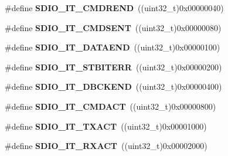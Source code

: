 \begin{DoxyCompactItemize}
\item 
\hypertarget{group___s_d_i_o___interrupt__sources_ga6df3bb694dc00e250cd22e16a03d6910}{\#define {\bfseries S\-D\-I\-O\-\_\-\-I\-T\-\_\-\-C\-M\-D\-R\-E\-N\-D}~((uint32\-\_\-t)0x00000040)}\label{group___s_d_i_o___interrupt__sources_ga6df3bb694dc00e250cd22e16a03d6910}

\item 
\hypertarget{group___s_d_i_o___interrupt__sources_gaf9d8fc4651c4b7555fb9ee4e5af6ca63}{\#define {\bfseries S\-D\-I\-O\-\_\-\-I\-T\-\_\-\-C\-M\-D\-S\-E\-N\-T}~((uint32\-\_\-t)0x00000080)}\label{group___s_d_i_o___interrupt__sources_gaf9d8fc4651c4b7555fb9ee4e5af6ca63}

\item 
\hypertarget{group___s_d_i_o___interrupt__sources_ga6cc1c521b64fc57b844336f7f175dd1e}{\#define {\bfseries S\-D\-I\-O\-\_\-\-I\-T\-\_\-\-D\-A\-T\-A\-E\-N\-D}~((uint32\-\_\-t)0x00000100)}\label{group___s_d_i_o___interrupt__sources_ga6cc1c521b64fc57b844336f7f175dd1e}

\item 
\hypertarget{group___s_d_i_o___interrupt__sources_ga55f7e65ed1b70d5a6abdc3cc41b55766}{\#define {\bfseries S\-D\-I\-O\-\_\-\-I\-T\-\_\-\-S\-T\-B\-I\-T\-E\-R\-R}~((uint32\-\_\-t)0x00000200)}\label{group___s_d_i_o___interrupt__sources_ga55f7e65ed1b70d5a6abdc3cc41b55766}

\item 
\hypertarget{group___s_d_i_o___interrupt__sources_gaa1b1fb453a3ce3b10928aaeada2b2186}{\#define {\bfseries S\-D\-I\-O\-\_\-\-I\-T\-\_\-\-D\-B\-C\-K\-E\-N\-D}~((uint32\-\_\-t)0x00000400)}\label{group___s_d_i_o___interrupt__sources_gaa1b1fb453a3ce3b10928aaeada2b2186}

\item 
\hypertarget{group___s_d_i_o___interrupt__sources_gae73ae9bc72eaeedc2a37221697bc33e2}{\#define {\bfseries S\-D\-I\-O\-\_\-\-I\-T\-\_\-\-C\-M\-D\-A\-C\-T}~((uint32\-\_\-t)0x00000800)}\label{group___s_d_i_o___interrupt__sources_gae73ae9bc72eaeedc2a37221697bc33e2}

\item 
\hypertarget{group___s_d_i_o___interrupt__sources_ga811e683588ab887abb0101defafdb51e}{\#define {\bfseries S\-D\-I\-O\-\_\-\-I\-T\-\_\-\-T\-X\-A\-C\-T}~((uint32\-\_\-t)0x00001000)}\label{group___s_d_i_o___interrupt__sources_ga811e683588ab887abb0101defafdb51e}

\item 
\hypertarget{group___s_d_i_o___interrupt__sources_ga1d9a59a2415b57bdf9827423cb6ce3a0}{\#define {\bfseries S\-D\-I\-O\-\_\-\-I\-T\-\_\-\-R\-X\-A\-C\-T}~((uint32\-\_\-t)0x00002000)}\label{group___s_d_i_o___interrupt__sources_ga1d9a59a2415b57bdf9827423cb6ce3a0}


\end{DoxyCompactItemize}
